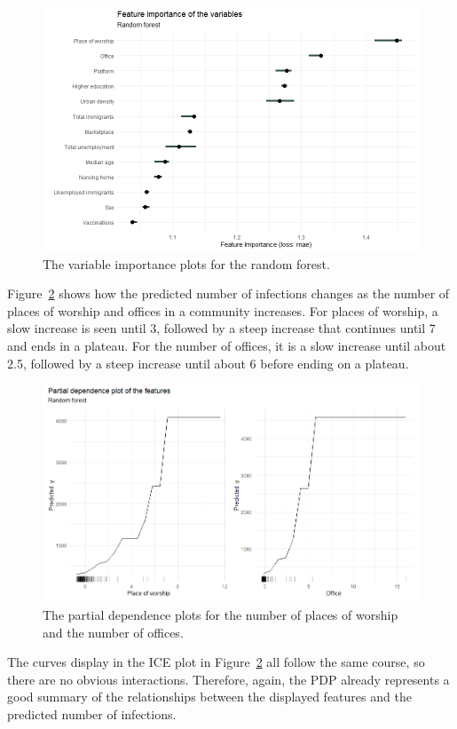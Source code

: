 \begin{figure}[H]
  \centering
  \includegraphics[width = \textwidth]{importance_rf_norway.png}
  \caption{The variable importance plots for the random forest.}
  \label{importance_rf_norway}
\end{figure}
Figure~\ref{pdp_rf_norway_1} shows how the predicted number of infections changes as the number of places of worship and offices in a community increases. For places of worship, a slow increase is seen until 3, followed by a steep increase that continues until 7 and ends in a plateau. For the number of offices, it is a slow increase until about 2.5, followed by a steep increase until about 6 before ending on a plateau.
\begin{figure}[H]
  \centering
  \includegraphics[width = \textwidth]{pdp_rf_norway_1.png}
  \caption{The partial dependence plots for the number of places of worship and the number of offices.}
  \label{pdp_rf_norway_1}
\end{figure}
The curves display in the ICE plot in Figure~\ref{pdp_rf_norway_1} all follow the same course, so there are no obvious interactions. Therefore, again, the PDP already represents a good summary of the relationships between the displayed features and the predicted number of infections. \\
